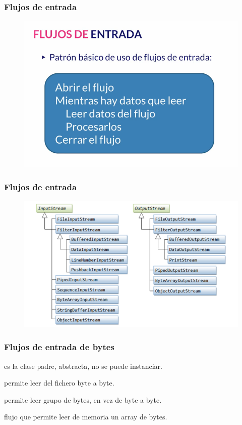 \documentclass{beamer}
\begin{document}
\begin{frame}
\frametitle{Flujos de entrada}
\begin{figure}
\includegraphics[scale=0.5]{imagenes/flujoEntrada2.png}
\end{figure}
\end{frame}


\begin{frame}
\frametitle{Flujos de entrada}
\begin{figure}
\includegraphics[scale=0.5]{imagenes/io.png}
\end{figure}
\end{frame}


\begin{frame}[fragile]
\frametitle{Flujos de entrada de bytes}
\begin{description}[<+->]
\item[InputStream] es la clase padre, abstracta, no se puede instanciar.
\item[FileInputStream] permite leer del fichero byte a byte.
\item[BufferedInputStream] permite leer grupo de bytes, en vez de byte a byte.
\item[ByteArrayInputStream] flujo que permite leer de memoria un array de bytes.
\end{description}
\pause
\end{frame}
\end{document}

